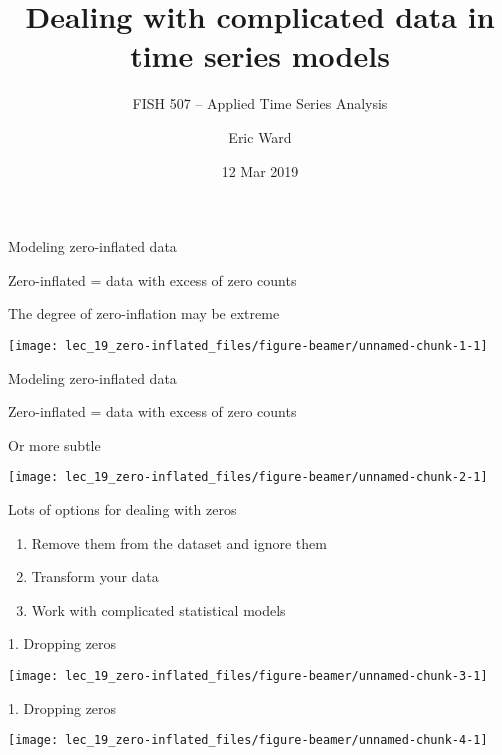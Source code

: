 \documentclass[ignorenonframetext,]{beamer}
\title{Dealing with complicated data in time series models}
\subtitle{FISH 507 -- Applied Time Series Analysis}
\author{Eric Ward}
\date{12 Mar 2019}
\begin{document}
\frame{\titlepage}

\begin{frame}{Modeling zero-inflated data}
\protect\hypertarget{modeling-zero-inflated-data}{}

Zero-inflated = data with excess of zero counts

The degree of zero-inflation may be extreme

\begin{center}\texttt{[image: lec\_19\_zero-inflated\_files/figure-beamer/unnamed-chunk-1-1]} \end{center}

\end{frame}

\begin{frame}{Modeling zero-inflated data}
\protect\hypertarget{modeling-zero-inflated-data-1}{}

Zero-inflated = data with excess of zero counts

Or more subtle

\begin{center}\texttt{[image: lec\_19\_zero-inflated\_files/figure-beamer/unnamed-chunk-2-1]} \end{center}

\end{frame}

\begin{frame}{Lots of options for dealing with zeros}
\protect\hypertarget{lots-of-options-for-dealing-with-zeros}{}

\begin{enumerate}
\item
  Remove them from the dataset and ignore them
\item
  Transform your data
\item
  Work with complicated statistical models
\end{enumerate}

\end{frame}

\begin{frame}{1. Dropping zeros}
\protect\hypertarget{dropping-zeros}{}

\begin{center}\texttt{[image: lec\_19\_zero-inflated\_files/figure-beamer/unnamed-chunk-3-1]} \end{center}

\end{frame}

\begin{frame}{1. Dropping zeros}
\protect\hypertarget{dropping-zeros-1}{}

\begin{center}\texttt{[image: lec\_19\_zero-inflated\_files/figure-beamer/unnamed-chunk-4-1]} \end{center}

\end{frame}
\end{document}

